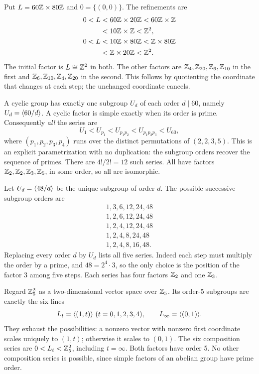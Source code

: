 Put $L=60\mathbb{Z}\times80\mathbb{Z}$ and $0=\{(0,0)\}$. The refinements are
\[
\begin{aligned}
0&<L<60\mathbb{Z}\times20\mathbb{Z}<60\mathbb{Z}\times\mathbb{Z}\\
&\hspace{2em}<10\mathbb{Z}\times\mathbb{Z}<\mathbb{Z}^2,\\
0&<L<10\mathbb{Z}\times80\mathbb{Z}<\mathbb{Z}\times80\mathbb{Z}\\
&\hspace{2em}<\mathbb{Z}\times20\mathbb{Z}<\mathbb{Z}^2.
\end{aligned}
\]
The initial factor is $L\cong\mathbb{Z}^2$ in both. The other factors are $\mathbb{Z}_4,\mathbb{Z}_{20},\mathbb{Z}_6,\mathbb{Z}_{10}$ in the first and $\mathbb{Z}_6,\mathbb{Z}_{10},\mathbb{Z}_4,\mathbb{Z}_{20}$ in the second. This follows by quotienting the coordinate that changes at each step; the unchanged coordinate cancels.

\idea A cyclic group has exactly one subgroup $U_d$ of each order $d\mid60$, namely $U_d=\langle 60/d\rangle$. A cyclic factor is simple exactly when its order is prime.
Consequently \emph{all} the series are
\[
U_1<U_{p_1}<U_{p_1p_2}<U_{p_1p_2p_3}<U_{60},
\]
where $(p_1,p_2,p_3,p_4)$ runs over the distinct permutations of $(2,2,3,5)$.
This is an explicit parametrization with no duplication: the subgroup orders recover the sequence of primes. There are $4!/2!=12$ such series. All have factors $\mathbb{Z}_2,\mathbb{Z}_2,\mathbb{Z}_3,\mathbb{Z}_5$, in some order, so all are isomorphic.

Let $U_d=\langle 48/d\rangle$ be the unique subgroup of order $d$. The possible successive subgroup orders are
\[
\begin{array}{c}
1,3,6,12,24,48\\
1,2,6,12,24,48\\
1,2,4,12,24,48\\
1,2,4,8,24,48\\
1,2,4,8,16,48.
\end{array}
\]
Replacing every order $d$ by $U_d$ lists all five series. Indeed each step must multiply the order by a prime, and $48=2^4\cdot3$, so the only choice is the position of the factor 3 among five steps. Each series has four factors $\mathbb{Z}_2$ and one $\mathbb{Z}_3$.

Regard $\mathbb{Z}_5^2$ as a two-dimensional vector space over $\mathbb{Z}_5$. Its order-5 subgroups are exactly the six lines
\[
L_t=\langle (1,t)\rangle\ (t=0,1,2,3,4),\qquad L_\infty=\langle (0,1)\rangle.
\]
They exhaust the possibilities: a nonzero vector with nonzero first coordinate scales uniquely to $(1,t)$; otherwise it scales to $(0,1)$.
The six composition series are $0<L_t<\mathbb{Z}_5^2$, including $t=\infty$. Both factors have order 5. No other composition series is possible, since simple factors of an abelian group have prime order.

